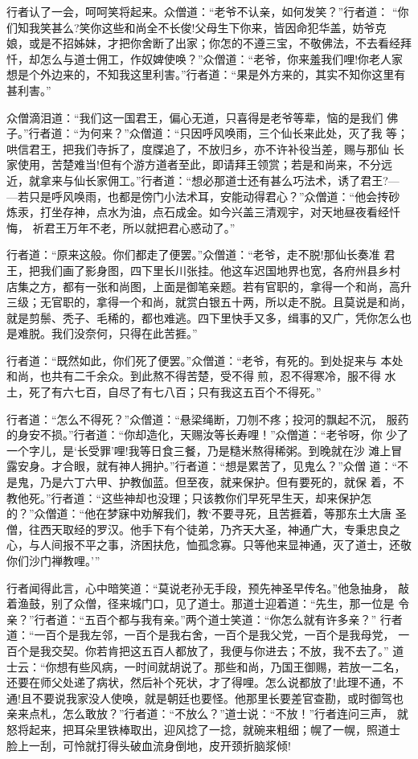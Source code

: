 行者认了一会，呵呵笑将起来。众僧道：“老爷不认亲，如何发笑？”行者道：
“你们知我笑甚么?笑你这些和尚全不长俊!父母生下你来，皆因命犯华盖，妨爷克
娘，或是不招姊妹，才把你舍断了出家；你怎的不遵三宝，不敬佛法，不去看经拜
忏，却怎么与道士佣工，作奴婢使唤？”众僧道：“老爷，你来羞我们哩!你老人家
想是个外边来的，不知我这里利害。”行者道：“果是外方来的，其实不知你这里有
甚利害。”

众僧滴泪道：“我们这一国君王，偏心无道，只喜得是老爷等辈，恼的是我们
佛子。”行者道：“为何来？”众僧道：“只因呼风唤雨，三个仙长来此处，灭了我
等；哄信君王，把我们寺拆了，度牒追了，不放归乡，亦不许补役当差，赐与那仙
长家使用，苦楚难当!但有个游方道者至此，即请拜王领赏；若是和尚来，不分远
近，就拿来与仙长家佣工。”行者道：“想必那道士还有甚么巧法术，诱了君王?—
—若只是呼风唤雨，也都是傍门小法术耳，安能动得君心？”众僧道：“他会抟砂
炼汞，打坐存神，点水为油，点石成金。如今兴盖三清观宇，对天地昼夜看经忏悔，
祈君王万年不老，所以就把君心惑动了。”

行者道：“原来这般。你们都走了便罢。”众僧道：“老爷，走不脱!那仙长奏准
君王，把我们画了影身图，四下里长川张挂。他这车迟国地界也宽，各府州县乡村
店集之方，都有一张和尚图，上面是御笔亲题。若有官职的，拿得一个和尚，高升
三级；无官职的，拿得一个和尚，就赏白银五十两，所以走不脱。且莫说是和尚，
就是剪鬃、秃子、毛稀的，都也难逃。四下里快手又多，缉事的又广，凭你怎么也
是难脱。我们没奈何，只得在此苦捱。”

行者道：“既然如此，你们死了便罢。”众僧道：“老爷，有死的。到处捉来与
本处和尚，也共有二千余众。到此熬不得苦楚，受不得煎，忍不得寒冷，服不得
水土，死了有六七百，自尽了有七八百；只有我这五百个不得死。”

行者道：“怎么不得死？”众僧道：“悬梁绳断，刀刎不疼；投河的飘起不沉，
服药的身安不损。”行者道：“你却造化，天赐汝等长寿哩！”众僧道：“老爷呀，你
少了一个字儿，是‘长受罪’哩!我等日食三餐，乃是糙米熬得稀粥。到晚就在沙
滩上冒露安身。才合眼，就有神人拥护。”行者道：“想是累苦了，见鬼么？”众僧
道：“不是鬼，乃是六丁六甲、护教伽蓝。但至夜，就来保护。但有要死的，就保
着，不教他死。”行者道：“这些神却也没理；只该教你们早死早生天，却来保护怎
的？”众僧道：“他在梦寐中劝解我们，教‘不要寻死，且苦捱着，等那东土大唐
圣僧，往西天取经的罗汉。他手下有个徒弟，乃齐天大圣，神通广大，专秉忠良之
心，与人间报不平之事，济困扶危，恤孤念寡。只等他来显神通，灭了道士，还敬
你们沙门禅教哩。’”

行者闻得此言，心中暗笑道：“莫说老孙无手段，预先神圣早传名。”他急抽身，
敲着渔鼓，别了众僧，径来城门口，见了道士。那道士迎着道：“先生，那一位是
令亲？”行者道：“五百个都与我有亲。”两个道士笑道：“你怎么就有许多亲？”
行者道：“一百个是我左邻，一百个是我右舍，一百个是我父党，一百个是我母党，
一百个是我交契。你若肯把这五百人都放了，我便与你进去；不放，我不去了。”
道士云：“你想有些风病，一时间就胡说了。那些和尚，乃国王御赐，若放一二名，
还要在师父处递了病状，然后补个死状，才了得哩。怎么说都放了!此理不通，不
通!且不要说我家没人使唤，就是朝廷也要怪。他那里长要差官查勘，或时御驾也
亲来点札，怎么敢放？”行者道：“不放么？”道士说：“不放！”行者连问三声，
就怒将起来，把耳朵里铁棒取出，迎风捻了一捻，就碗来粗细；幌了一幌，照道士
脸上一刮，可怜就打得头破血流身倒地，皮开颈折脑浆倾!


